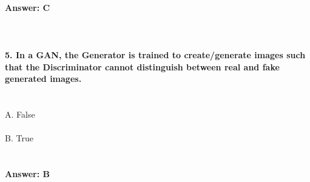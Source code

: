 \documentclass[prl,twocolumn,showpacs,preprintnumbers,superscriptaddress]{revtex4}
\theoremstyle{plain}
\theoremstyle{definition}
\begin{document}
\begin{widetext}
\\
\textbf{Answer: C}
\\
\\
\\
\\
\textbf{5. In a GAN, the Generator is trained to create/generate images such that the Discriminator cannot distinguish between real and fake generated images.}
\\
\\
\\
A. False
\\
\\
B. True
\\
\\
\\
\textbf{Answer: B}
\\
\\
\\
\\
\\
\\
\end{widetext}
\end{document}
